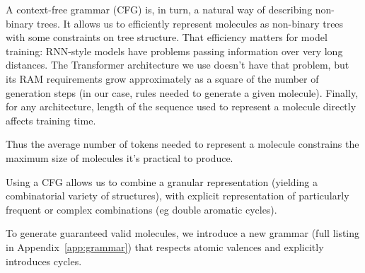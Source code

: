 \documentclass{article}
\begin{document}
A context-free grammar (CFG) is, in turn, a natural way of describing non-binary trees. 
%
It allows us to efficiently represent molecules as non-binary trees with some constraints on tree structure. That efficiency matters for model training: RNN-style models have problems passing information over very long distances. The Transformer architecture we use doesn't have that problem, but its RAM requirements grow approximately as a square of the number of generation steps (in our case, rules needed to generate a given molecule). Finally, for any architecture, length of the sequence used to represent a molecule directly affects training time. 

Thus the average number of tokens needed to represent a molecule constrains the maximum size of molecules it's practical to produce.

Using a CFG allows us to combine a granular representation (yielding a combinatorial variety of structures), with explicit representation of particularly frequent or complex combinations (eg double aromatic cycles).

To generate guaranteed valid molecules, we introduce a new grammar (full listing in Appendix~\ref{app:grammar}) that respects atomic valences and explicitly introduces cycles.
\end{document}
